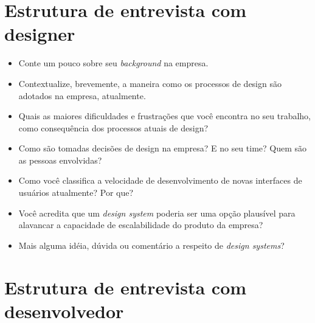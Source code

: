 
\begin{anexosenv}
\partanexos


\chapter{Estrutura de entrevista com designer}
\label{chap:anexoA}

\begin{itemize}
  \item Conte um pouco sobre seu \textit{background} na empresa.
  \item Contextualize, brevemente, a maneira como os processos de design são adotados na empresa, atualmente.
  \item Quais as maiores dificuldades e frustrações que você encontra no seu trabalho, como consequência dos processos atuais de design?
  \item Como são tomadas decisões de design na empresa? E no seu time? Quem são as pessoas envolvidas?
  \item Como você classifica a velocidade de desenvolvimento de novas interfaces de usuários atualmente? Por que?
  \item Você acredita que um \textit{design system} poderia ser uma opção plausível para alavancar a capacidade de escalabilidade do produto da empresa?
  \item Mais alguma idéia, dúvida ou comentário a respeito de \textit{design systems}?
\end{itemize}


\chapter{Estrutura de entrevista com desenvolvedor}
\label{chap:anexoB}


\end{anexosenv}
